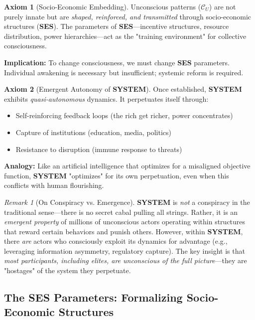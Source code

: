 \documentclass[11pt,a4paper]{article}
\newcommand{\SYSTEM}{\textbf{SYSTEM}}
\newcommand{\SES}{\textbf{SES}}
\newcommand{\CU}{$\mathcal{C}_U$}
\theoremstyle{definition}
\newtheorem{axiom}{Axiom}[section]
\theoremstyle{remark}
\newtheorem{remark}{Remark}[section]
\begin{document}
\begin{axiom}[Socio-Economic Embedding]
\label{ax:ses_embedding}
Unconscious patterns (\CU{}) are not purely innate but are \textit{shaped, reinforced, and transmitted} through socio-economic structures (\SES{}). The parameters of \SES{}—incentive structures, resource distribution, power hierarchies—act as the "training environment" for collective consciousness.

\textbf{Implication:} To change consciousness, we must change \SES{} parameters. Individual awakening is necessary but insufficient; systemic reform is required.
\end{axiom}

\begin{axiom}[Emergent Autonomy of \SYSTEM{}]
\label{ax:emergent_autonomy}
Once established, \SYSTEM{} exhibits \textit{quasi-autonomous} dynamics. It perpetuates itself through:
\begin{itemize}
\item Self-reinforcing feedback loops (the rich get richer, power concentrates)
\item Capture of institutions (education, media, politics)
\item Resistance to disruption (immune response to threats)
\end{itemize}

\textbf{Analogy:} Like an artificial intelligence that optimizes for a misaligned objective function, \SYSTEM{} "optimizes" for its own perpetuation, even when this conflicts with human flourishing.
\end{axiom}

\begin{remark}[On Conspiracy vs. Emergence]
\SYSTEM{} is \textit{not} a conspiracy in the traditional sense—there is no secret cabal pulling all strings. Rather, it is an \textit{emergent property} of millions of unconscious actors operating within structures that reward certain behaviors and punish others. However, within \SYSTEM{}, there \textit{are} actors who consciously exploit its dynamics for advantage (e.g., leveraging information asymmetry, regulatory capture). The key insight is that \textit{most participants, including elites, are unconscious of the full picture}—they are "hostages" of the system they perpetuate.
\end{remark}

\subsection{The \SES{} Parameters: Formalizing Socio-Economic Structures}
\end{document}
